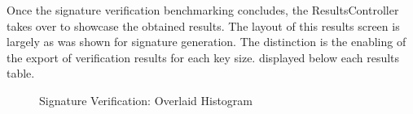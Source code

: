 \documentclass[]{final_report}
\theoremstyle{definition}
\begin{document}
Once the signature verification benchmarking concludes, the ResultsController takes over to showcase the obtained results. The layout of this results screen is largely as was shown for signature generation. The distinction is the enabling of the export of verification results for each key size. displayed below each results table.

\begin{figure}[H]
    \centering %
    
    \begin{minipage}{0.7\textwidth}
        \centering
        \caption{Signature Verification: Overlaid Histogram}
        \label{fig:image1}
    \end{minipage}
    \hfill %
    \begin{minipage}{0.7\textwidth}
        \centering

\end{minipage}
\end{figure}
\end{document}

